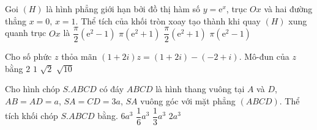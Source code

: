\begin{ex}%
	Goi $(H)$ là hình phẳng giới hạn bởi đồ thị hàm số $y=\mathrm{e}^x$, trục $Ox$ và hai đường thẳng $x=0,\,x=1$. Thể tích của khối tròn xoay tạo thành khi quay $(H)$ xung quanh trục $Ox$ là
	\choice
	{\True $\dfrac{\pi}{2}(\mathrm{e}^2-1)$}
	{$\pi (\mathrm{e}^2+1)$}
	{$\dfrac{\pi}{2}(\mathrm{e}^2+1)$}
	{$\pi (\mathrm{e}^2-1)$}
\end{ex}

\begin{ex}%
	Cho số phức $z$ thỏa mãn $(1+2i)z=(1+2i)-(-2+i)$. Mô-đun của $z$ bằng
	\choice
	{$2$}
	{$1$}
	{\True $\sqrt{2}$}
	{$\sqrt{10}$}
\end{ex}

\begin{ex}%
	Cho hình chóp $S.ABCD$ có đáy $ABCD$ là hình thang vuông tại $A$ và $D$, $AB=AD=a$, $SA=CD=3a$, $SA$ vuông góc với mặt phẳng $(ABCD)$. Thể tích khối chóp $S.ABCD$ bằng.
	\choice
	{$6a^3$}
	{$\dfrac{1}{6}a^3$}
	{$\dfrac{1}{3}a^3$}
	{\True $2a^3$}
\end{ex}

